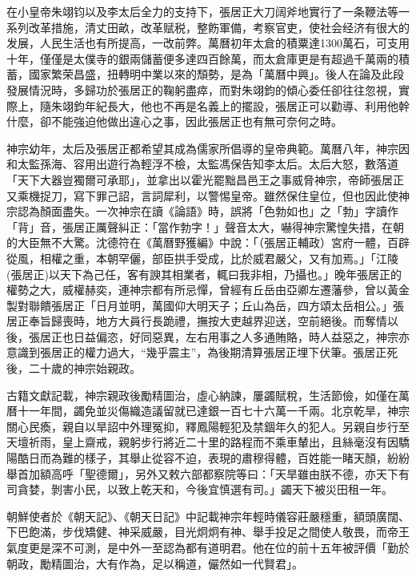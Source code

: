 在小皇帝朱翊钧以及李太后全力的支持下，張居正大刀阔斧地實行了一条鞭法等一系列改革措施，清丈田畝，改革赋税，整飭軍備，考察官吏，使社会经济有很大的发展，人民生活也有所提高，一改前弊。萬曆初年太倉的積粟達1300萬石，可支用十年，僅僅是太僕寺的銀兩儲蓄便多達四百餘萬，而太倉庫更是有超過千萬兩的積蓄，國家繁荣昌盛，扭轉明中業以來的頹勢，是為「萬曆中興」。後人在論及此段發展情況時，多歸功於張居正的鞠躬盡瘁，而對朱翊鈞的傾心委任卻往往忽視，實際上，隨朱翊鈞年紀長大，他也不再是名義上的擺設，張居正可以勸導、利用他幹什麼，卻不能強迫他做出違心之事，因此張居正也有無可奈何之時。

神宗幼年，太后及張居正都希望其成為儒家所倡導的皇帝典範。萬曆八年，神宗因和太監孫海、容用出遊行為輕浮不檢，太監馮保告知李太后。太后大怒，數落道「天下大器豈獨爾可承耶」，並拿出以霍光罷黜昌邑王之事威脅神宗，帝師張居正又乘機捉刀，寫下罪己詔，言詞犀利，以警惕皇帝。雖然保住皇位，但也因此使神宗認為顏面盡失。一次神宗在讀《論語》時，誤將「色勃如也」之「勃」字讀作「背」音，張居正厲聲糾正：「當作勃字！」聲音太大，嚇得神宗驚惶失措，在朝的大臣無不大驚。沈德符在《萬曆野獲編》中說：「（張居正輔政）宮府一體，百辟從風，相權之重，本朝罕儷，部臣拱手受成，比於威君嚴父，又有加焉。」「江陵(張居正)以天下為己任，客有諛其相業者，輒曰我非相，乃攝也。」晚年張居正的權勢之大，威權赫奕，連神宗都有所忌憚，曾經有丘岳由亞卿左遷藩參，曾以黃金製對聯饋張居正「日月並明，萬國仰大明天子；丘山為岳，四方頌太岳相公。」張居正奉旨歸喪時，地方大員行長跪禮，撫按大吏越界迎送，空前絕後。而奪情以後，張居正也日益偏恣，好同惡異，左右用事之人多通賄賂，時人益惡之，神宗亦意識到張居正的權力過大，“幾乎震主”，為後期清算張居正埋下伏筆。張居正死後，二十歲的神宗始親政。

古籍文獻記載，神宗親政後勵精圖治，虛心納諫，屢蠲賦稅，生活節儉，如僅在萬曆十一年間，蠲免並災傷織造議留就已達銀一百七十六萬一千兩。北京乾旱，神宗關心民瘓，親自以旱詔中外理冤抑，釋鳳陽輕犯及禁錮年久的犯人。另親自步行至天壇祈雨，皇上齋戒，親躬步行將近二十里的路程而不乘車輦出，且絲毫沒有因驕陽酷日而為難的樣子，其舉止從容不迫，表現的肅穆得體，百姓能一睹天顏，紛紛舉首加額高呼「聖德爾」，另外又敕六部都察院等曰：「天旱雖由朕不德，亦天下有司貪婪，剝害小民，以致上乾天和，今後宜慎選有司。」蠲天下被災田租一年。

朝鮮使者於《朝天記》、《朝天日記》中記載神宗年輕時儀容莊嚴穩重，額頭廣闊、下巴飽滿，步伐矯健、神采威嚴，目光炯炯有神、舉手投足之間使人敬畏，而帝王氣度更是深不可測，是中外一至認為都有道明君。他在位的前十五年被評價「勤於朝政，勵精圖治，大有作為，足以稱道，儼然如一代賢君」。

